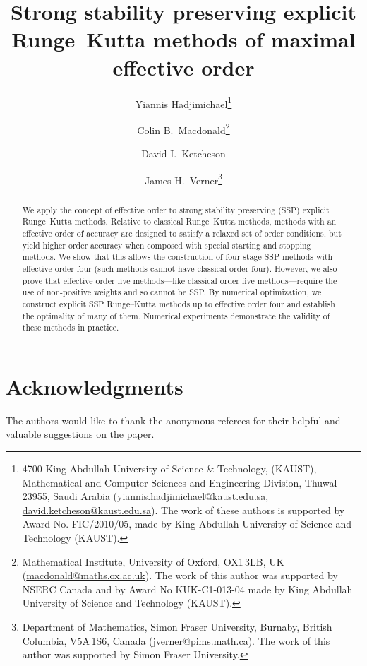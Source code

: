 \documentclass[10pt,a4paper,oneside]{article}
\title{Strong stability preserving explicit Runge--Kutta methods of maximal effective order}
\author{
	Yiannis Hadjimichael\footnote{4700 King Abdullah University of Science \& Technology, 
	(KAUST), Mathematical and Computer Sciences and Engineering Division, Thuwal 23955, 
	Saudi Arabia
	(\url{yiannis.hadjimichael@kaust.edu.sa}, 
	\url{david.ketcheson@kaust.edu.sa}).
	The work of these authors is supported by Award No. FIC/2010/05, made by King 
	Abdullah University of Science and Technology (KAUST).}
    	\and 
    	Colin B.~Macdonald\thanks{Mathematical Institute, University of Oxford, OX1\,3LB, UK 
    	(\url{macdonald@maths.ox.ac.uk}).
    	The work of this author was supported by NSERC 
    	Canada and by Award No KUK-C1-013-04 made by King Abdullah University of Science 
    	and Technology (KAUST).}
    	\and 
    	David I.~Ketcheson\footnotemark[1]
    	\and 
    	James H.~Verner\thanks{Department of Mathematics, Simon Fraser University,
    	Burnaby, British Columbia, V5A\,1S6, Canada
    	(\url{jverner@pims.math.ca}).
    	The work of this author was supported by Simon Fraser University.}
}
\numberwithin{theorem}{section}
\numberwithin{equation}{section}
\numberwithin{table}{section}
\numberwithin{figure}{section}
\begin{document}
	\maketitle
	
	
	\begin{abstract}
  		We apply the concept of effective order to strong stability preserving 
  		(SSP) explicit Runge--Kutta methods.
  		Relative to classical Runge--Kutta methods, methods with an effective order of accuracy
  		are designed to satisfy a relaxed set of order conditions, but yield higher 
  		order accuracy  when composed with special starting and stopping methods. 
         We show that this allows the construction of four-stage SSP methods with 
         effective order four (such methods cannot have classical order four). 
         However, we also prove that effective order five methods---like classical
         order five methods---require the use of non-positive weights and so cannot
         be SSP.
         By numerical optimization, we construct explicit SSP Runge--Kutta methods 
         up to effective order four and establish the optimality of many of them.
  		Numerical experiments demonstrate the validity of these methods in
  		practice.
	\end{abstract}

	
	
	
	
	
	
	

	\section*{Acknowledgments}{
		The authors would like to thank the anonymous referees for their helpful 
		and valuable suggestions on the paper.
	}

	
\end{document}
